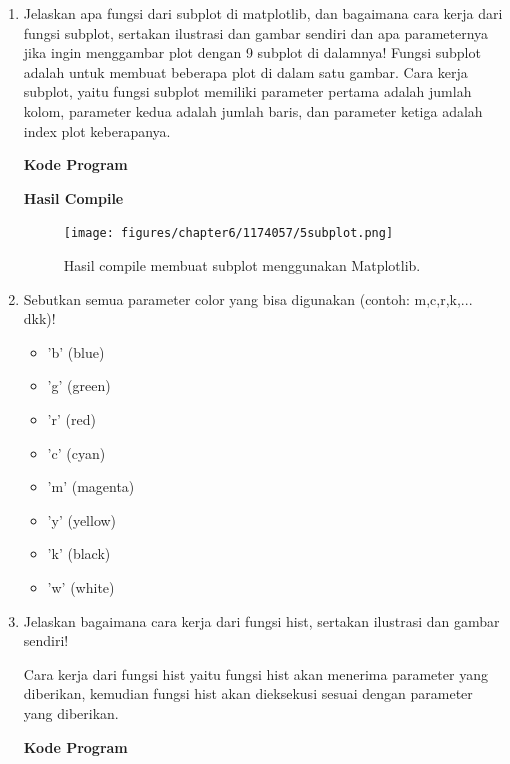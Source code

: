 \begin{enumerate}
		\item Jelaskan apa fungsi dari subplot di matplotlib, dan bagaimana cara kerja dari fungsi subplot, sertakan ilustrasi dan gambar sendiri dan apa parameternya jika ingin menggambar plot dengan 9 subplot di dalamnya!
			\hfill \break
			Fungsi subplot adalah untuk membuat beberapa plot di dalam satu gambar.
			\hfill \break
			Cara kerja subplot, yaitu fungsi subplot memiliki parameter pertama adalah jumlah kolom, parameter kedua adalah jumlah baris, dan parameter ketiga adalah index plot keberapanya.

			\hfill \break
			\textbf{Kode Program}

			

			\hfill \break
			\textbf{Hasil Compile}

			\begin{figure}[H]
				\texttt{[image: figures/chapter6/1174057/5subplot.png]}
				\centering
				\caption{Hasil compile membuat subplot menggunakan Matplotlib.}
			\end{figure}

		\item Sebutkan semua parameter color yang bisa digunakan (contoh:  m,c,r,k,...  dkk)!
		
			\begin{itemize}
				\item 'b' (blue)
				\item 'g' (green)
				\item 'r' (red)
				\item 'c' (cyan)
				\item 'm' (magenta)
				\item 'y' (yellow)
				\item 'k' (black)
				\item 'w' (white)
			\end{itemize}

		\item Jelaskan bagaimana cara kerja dari fungsi hist, sertakan ilustrasi dan gambar sendiri!

			\hfill \break
			Cara kerja dari fungsi hist yaitu fungsi hist akan menerima parameter yang diberikan, kemudian fungsi hist akan dieksekusi sesuai dengan parameter yang diberikan.

			\hfill \break
			\textbf{Kode Program}

			


\end{enumerate}
